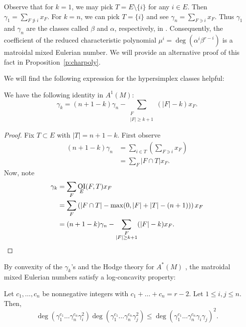 \documentclass[ALCO,published]{cedram}
\numberwithin{equation}{section}
\numberwithin{figure}{section}
\DeclareMathOperator{\OI}{OI}
\begin{document}
\begin{rema}
  Observe that for $k=1$, we may pick $T=E\setminus\{i\}$ for any $i\in E$. Then $\gamma_1=\sum_{F\not\ni i}x_F.$
  For $k=n$, we can pick $T=\{i\}$ and see $\gamma_n=\sum_{F\ni i}x_F.$
  Thus $\gamma_1$ and $\gamma_n$ are the classes called $\beta$ and $\alpha$, respectively, in \cite{AHK}.
  Consequently, the coefficient of the reduced characteristic polynomial $\mu^i=\deg(\alpha^i\beta^{r-i})$ is a matroidal mixed Eulerian number. We will provide an alternative proof of this fact in Proposition~\ref{p:charpoly}.
\end{rema}


We will find the following expression for the hypersimplex classes helpful:
\begin{lemma} \label{l:flatsizesum} We have the following identity in $A^1(M)$:
\[\gamma_k=(n+1-k)\gamma_n-\sum_{\substack{F\\|F|\geq k+1}} (|F|-k)x_F.\]
\end{lemma}

\begin{proof}
    Fix $T\subset E$ with $|T|=n+1-k$. First observe
    \begin{align*}
        (n+1-k)\gamma_n&=\sum_{i\in T} \left(\sum_{F\ni i} x_F\right)\\
        &= \sum_{F} |F\cap T| x_F.
    \end{align*}
    Now, note
    \begin{align*}
        \gamma_k&=\sum_F \OI_{E}(F,T)x_F\\
        &=\sum_F \left(|F\cap T|-\max(0,|F|+|T|-(n+1))\right)x_F\\
        &=(n+1-k)\gamma_n-\sum_{\substack{F\\|F|\geq k+1}} (|F|-k)x_F. \qedhere
    \end{align*} 
\end{proof}

By convexity of the $\gamma_k$'s and the Hodge theory for $A^*(M)$ \cite[Lemma 9.6]{AHK}, the matroidal mixed Eulerian numbers satisfy a log-concavity property:
\begin{theorem} \label{t:logconcave} Let $c_1,\dots,c_n$ be nonnegative integers with $c_1+\dots+c_n=r-2$. Let $1\leq i,j\leq n$. Then,
\[\deg(\gamma_1^{c_1}\dots\gamma_n^{c_n}\gamma_i^2)\deg(\gamma_1^{c_1}\dots\gamma_n^{c_n}\gamma_j^2)\leq \deg(\gamma_1^{c_1}\dots\gamma_n^{c_n}\gamma_i\gamma_j)^2.\]
\end{theorem}
\end{document}
